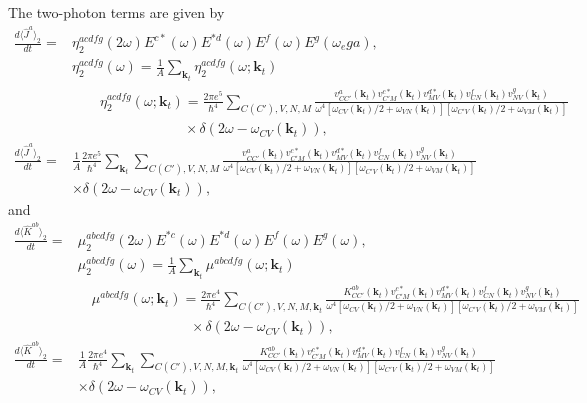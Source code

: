\documentclass{article}
\begin{document}
The two-photon terms are given by 
\begin{align}
    \frac{d \langle \hat{J}^{a} \rangle_{2}}{dt} = & \eta_{2}^{acdfg}(2\omega) E^{c*}(\omega) E^{*d}(\omega) E^{f}(\omega) E^{g}(\omega_ega),\nonumber \\
    & \eta_{2}^{acdfg}(\omega) = \frac{1}{A} \sum_{\mathbf{k}_{t}} \eta^{acdfg}_{2}(\omega;\mathbf{k}_{t})\nonumber \\
    & \qquad \eta^{acdfg}_{2}(\omega;\mathbf{k}_{t}) = \frac{2\pi e^{5}}{\hbar^{4}} \sum_{C(C'),V,N,M} \frac{v^{a}_{CC'}(\mathbf{k}_{t}) v^{c*}_{C'M}(\mathbf{k}_{t}) v^{d*}_{MV}(\mathbf{k}_{t}) v^{f}_{CN}(\mathbf{k}_{t}) v^{g}_{NV}(\mathbf{k}_{t}) }{\omega^{4}[\omega_{CV}(\mathbf{k}_{t})/2 + \omega_{VN}(\mathbf{k}_{t})] [\omega_{C'V}(\mathbf{k}_{t})/2 + \omega_{VM}(\mathbf{k}_{t})] } \nonumber \\ & \qquad \qquad \qquad \qquad \times \delta(2\omega-\omega_{CV}(\mathbf{k}_{t})), \nonumber \\
    \frac{d \langle \hat{J}^{a} \rangle_{2}}{dt} = & \frac{1}{A} \frac{2\pi e^{5}}{\hbar^{4}} \sum_{\mathbf{k}_{t}} \sum_{C(C'),V,N,M} \frac{v^{a}_{CC'}(\mathbf{k}_{t}) v^{c*}_{C'M}(\mathbf{k}_{t}) v^{d*}_{MV}(\mathbf{k}_{t}) v^{f}_{CN}(\mathbf{k}_{t}) v^{g}_{NV}(\mathbf{k}_{t}) }{\omega^{4}[\omega_{CV}(\mathbf{k}_{t})/2 + \omega_{VN}(\mathbf{k}_{t})] [\omega_{C'V}(\mathbf{k}_{t})/2 + \omega_{VM}(\mathbf{k}_{t})]} \nonumber \\ 
    & \times \delta(2\omega-\omega_{CV}(\mathbf{k}_{t})), 
\end{align}
and
\begin{align}
    \frac{d \langle \hat{K}^{ab} \rangle_{2}}{dt} = & \mu_{2}^{abcdfg}(2\omega) E^{*c}(\omega) E^{*d}(\omega) E^{f}(\omega) E^{g}(\omega), \nonumber \\
    & \mu_{2}^{abcdfg}(\omega) = \frac{1}{A} \sum_{\mathbf{k}_{t}} \mu^{abcdfg}(\omega;\mathbf{k}_{t}) \nonumber \\
    & \quad  \mu^{abcdfg}(\omega;\mathbf{k}_{t}) = \frac{2\pi e^{4}}{\hbar^{4}} \sum_{C(C'),V,N,M,\mathbf{k}_{t}} \frac{K^{ab}_{CC'}(\mathbf{k}_{t}) v^{c*}_{C'M}(\mathbf{k}_{t}) v^{d*}_{MV}(\mathbf{k}_{t}) v^{f}_{CN}(\mathbf{k}_{t}) v^{g}_{NV}(\mathbf{k}_{t}) }{\omega^{4}[\omega_{CV}(\mathbf{k}_{t})/2 + \omega_{VN}(\mathbf{k}_{t})] [\omega_{C'V}(\mathbf{k}_{t})/2 + \omega_{VM}(\mathbf{k}_{t})] } \nonumber \\ & \qquad \qquad \qquad \qquad \times \delta(2\omega-\omega_{CV}(\mathbf{k}_{t})), \nonumber \\
    \frac{d \langle \hat{K}^{ab} \rangle_{2}}{dt} = &  \frac{1}{A} \frac{2\pi e^{4}}{\hbar^{4}} \sum_{\mathbf{k}_{t}} \sum_{C(C'),V,N,M,\mathbf{k}_{t}} \frac{K^{ab}_{CC'}(\mathbf{k}_{t}) v^{c*}_{C'M}(\mathbf{k}_{t}) v^{d*}_{MV}(\mathbf{k}_{t}) v^{f}_{CN}(\mathbf{k}_{t}) v^{g}_{NV}(\mathbf{k}_{t}) }{\omega^{4}[\omega_{CV}(\mathbf{k}_{t})/2 + \omega_{VN}(\mathbf{k}_{t})] [\omega_{C'V}(\mathbf{k}_{t})/2 + \omega_{VM}(\mathbf{k}_{t})] } \nonumber \\ 
    & \times \delta(2\omega-\omega_{CV}(\mathbf{k}_{t})),
\end{align}
\end{document}
